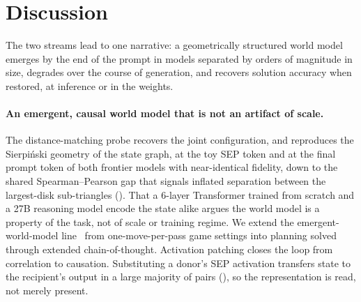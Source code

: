 \documentclass{article} %
\begin{document}
\section{Discussion}
\label{sec:discussion}

The two streams lead to one narrative: a geometrically structured world model emerges by the end of the prompt in models separated by orders of magnitude in size, degrades over the course of generation, and recovers solution accuracy when restored, at inference or in the weights.

\paragraph{An emergent, causal world model that is not an artifact of scale.}
The distance-matching probe recovers the joint configuration, and reproduces the Sierpi\'nski geometry of the state graph, at the toy SEP token and at the final prompt token of both frontier models with near-identical fidelity, down to the shared Spearman--Pearson gap that signals inflated separation between the largest-disk sub-triangles (). That a 6-layer Transformer trained from scratch and a 27B reasoning model encode the state alike argues the world model is a property of the task, not of scale or training regime. We extend the emergent-world-model line~\citep{li2022emergent, toshniwal2022chess, spies2025transformers} from one-move-per-pass game settings into planning solved through extended chain-of-thought. Activation patching closes the loop from correlation to causation. Substituting a donor's SEP activation transfers state to the recipient's output in a large majority of pairs (), so the representation is read, not merely present. 
\end{document}
